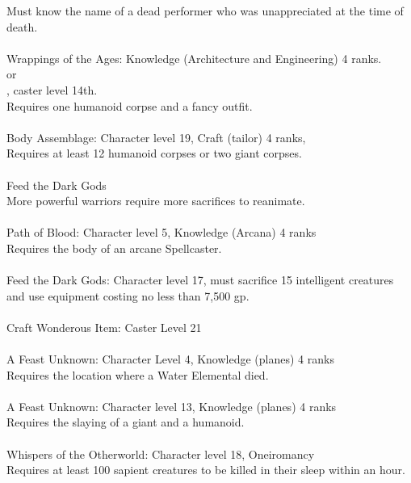 \begin{multicols}{2}
\begin{small}
Must know the name of a dead performer who was unappreciated at the time of death.\\
\\
Wrappings of the Ages: Knowledge (Architecture and Engineering) 4 ranks.\\
or\\
, caster level 14th.\\
Requires one humanoid corpse and a fancy outfit.\\
\\
Body Assemblage: Character level 19, Craft (tailor) 4 ranks,\\
Requires at least 12 humanoid corpses or two giant corpses.\\
\\
Feed the Dark Gods\\
More powerful warriors require more sacrifices to reanimate.\\
\\
Path of Blood: Character level 5, Knowledge (Arcana) 4 ranks\\
Requires the body of an arcane Spellcaster.\\
\\
Feed the Dark Gods: Character level 17, must sacrifice 15 intelligent creatures and use equipment costing no less than 7,500 gp.\\
\\
Craft Wonderous Item: Caster Level 21\\
\\
A Feast Unknown: Character Level 4, Knowledge (planes) 4 ranks\\
Requires the location where a Water Elemental died.\\
\\
A Feast Unknown: Character level 13, Knowledge (planes) 4 ranks\\
Requires the slaying of a giant and a humanoid.\\
\\
Whispers of the Otherworld: Character level 18, Oneiromancy\\
Requires at least 100 sapient creatures to be killed in their sleep within an hour.\\

\end{small}
\end{multicols}
